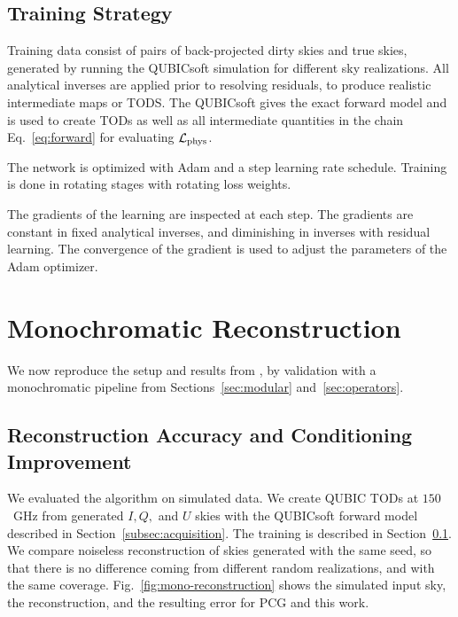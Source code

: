 \documentclass[a4paper,11pt]{article}
\begin{document}
\subsection{Training Strategy}
\label{subsec:training}

Training data consist of pairs of back-projected dirty skies and true skies, generated by running the
QUBICsoft simulation for different sky realizations. All analytical inverses are applied prior to resolving residuals, to produce realistic intermediate maps or TODS. The QUBICsoft gives the exact forward model and is used to create TODs as well as all intermediate quantities in the chain Eq.~\ref{eq:forward} for evaluating $\mathcal{L}_{\rm phys}$.

The network is optimized with Adam and a step learning rate schedule. Training is done in rotating stages with rotating loss weights. 

The gradients of the learning are inspected at each step. The gradients are constant in fixed analytical inverses, and diminishing in inverses with residual learning. The convergence of the gradient is used to adjust the parameters of the Adam optimizer. 

\section{Monochromatic Reconstruction}
\label{sec:validation-mono}

We now reproduce the setup and results from \cite{kardum2025proceeding}, by validation with a monochromatic pipeline from Sections~\ref{sec:modular} and~\ref{sec:operators}.

\subsection{Reconstruction Accuracy and Conditioning Improvement}
\label{subsec:accuracy}

We evaluated the algorithm on simulated data. We create QUBIC TODs at $150$~GHz from generated $I,Q,$ and $U$ skies with the QUBICsoft forward model described in Section~\ref{subsec:acquisition}. The training is described in Section~\ref{subsec:training}. We compare noiseless reconstruction of skies generated with the same seed, so that there is no difference coming from different random realizations, and with the same coverage. Fig.~\ref{fig:mono-reconstruction} shows the simulated input sky, the reconstruction, and the resulting error for PCG and this work. 
\end{document}
